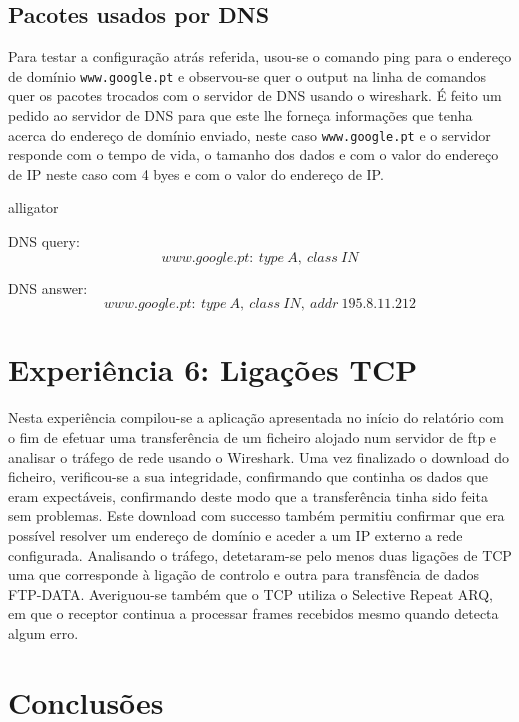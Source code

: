 \documentclass[a4paper,11pt,titlepage]{article}
\begin{document}
\subsection{Pacotes usados por DNS}
Para testar a configuração atrás referida, usou-se o comando ping para o endereço de domínio \texttt{www.google.pt} e observou-se quer o output na linha de comandos quer os pacotes trocados com o servidor de DNS usando o wireshark.
É feito um pedido ao servidor de DNS para que este lhe forneça informações que tenha acerca do endereço de domínio enviado, neste caso \texttt{www.google.pt} e o servidor responde com o tempo de vida, o tamanho dos dados e com o valor do endereço de IP neste caso com 4 byes e com o valor do endereço de IP.

\begin{labeling}{alligator}
\item DNS query:
$$www.google.pt:\ type\ A,\ class\ IN$$

\item DNS answer:
$$www.google.pt:\ type\ A,\ class\ IN,\ addr\ 195.8.11.212$$

\end{labeling}

\section{Experiência 6: Ligações TCP}
Nesta experiência compilou-se a aplicação apresentada no início do relatório com o fim de efetuar uma transferência de um ficheiro alojado num servidor de ftp e analisar o tráfego de rede usando o Wireshark. Uma vez finalizado o download do ficheiro, verificou-se a sua integridade, confirmando que continha os dados que eram expectáveis, confirmando deste modo que a transferência tinha sido feita sem problemas. Este download com successo também permitiu confirmar que era possível resolver um endereço de domínio e aceder a um IP externo a rede configurada. Analisando o tráfego, detetaram-se pelo menos duas ligações de TCP uma que corresponde à ligação de controlo e outra para transfência de dados FTP-DATA. Averiguou-se também que o TCP utiliza o Selective Repeat ARQ, em que o receptor continua a processar frames recebidos mesmo quando detecta algum erro.

\section{Conclusões}

\end{document}
